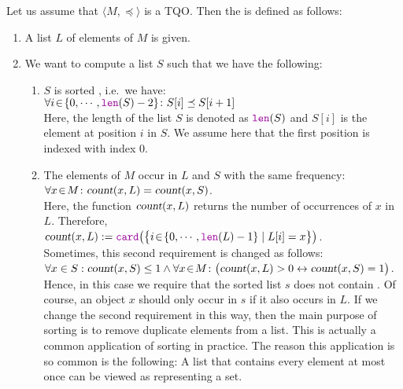 Let us assume that $\langle M, \preceq \rangle$ is a  \textsc{TQO}.
Then the  is defined as follows:
\begin{enumerate}
\item A list $L$ of elements of $M$ is given.
\item We want to compute a list $S$ such that we have the following: 
  \begin{enumerate}
  \item $S$ is sorted , i.e.~we have: \\[0.2cm]
        \hspace*{1.3cm} 
        $\forall i \el \{ 0, \cdots, \mytt{len}(S)-2 \} \colon S[i] \preceq S[i+1]$ 
        \\[0.2cm]
        Here, the length of the list $S$ is denoted as $\mytt{len}(S)$ and $S[i]$ is the element at position
        $i$ in $S$.  We assume here that the first position is indexed with index $0$.
  \item The elements of $M$ occur in $L$ and $S$ with the same frequency: \\[0.2cm]
        \hspace*{1.3cm} 
        $\forall x\!\in\! M \colon \textsl{count}(x,L) = \textsl{count}(x,S)$.
        \\[0.2cm]
        Here, the function $\textsl{count}(x,L)$ returns the number of occurrences of $x$ in $L$.
        Therefore,  \\[0.2cm]
        \hspace*{1.3cm}
        $\textsl{count}(x,L) := \mytt{card}\bigl(\bigl\{ i \el \{0,\cdots,\mytt{len}(L)-1\} \mid L[i] = x \bigr\}\bigr)$.
        \\[0.2cm]
        Sometimes, this second requirement is changed as follows:
        \\[0.2cm]
        \hspace*{1.3cm}
        $\forall x \in S: \textsl{count}(x,S) \leq 1 \wedge \forall x\!\in\! M \colon \bigl(\textsl{count}(x,L) > 0 \leftrightarrow \textsl{count}(x,S) = 1\bigr)$.
        \\[0.2cm]
        Hence, in this case we require that the sorted list $s$ does not contain
        .
        Of course, an object $x$ should only occur in $s$ if it also occurs in $L$.  If we change
        the second requirement in this way, then the main purpose of sorting is to remove duplicate
        elements from a list.  This is actually a common application of sorting in practice.  The
        reason this application is so common is the following: A list that contains every element at
        most once can be viewed as representing a set.
  \end{enumerate}
\end{enumerate}

